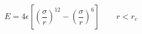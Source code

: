 


$$
 E = 4 \epsilon \left[ \left(\frac{\sigma}{r}\right)^{12} - 
                       \left(\frac{\sigma}{r}\right)^6 \right]
                       \qquad r < r_c
$$

